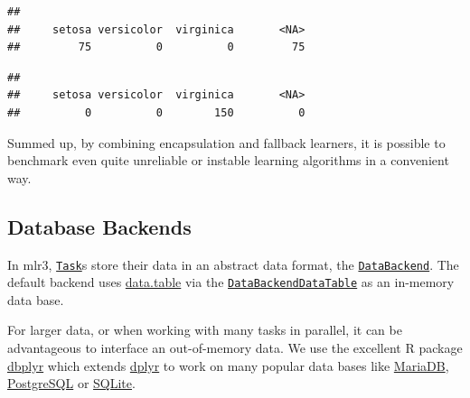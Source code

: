 \documentclass[]{article}
\newenvironment{Shaded}{\begin{snugshade}}{\end{snugshade}}
\newcommand{\CommentTok}[1]{\textcolor[rgb]{0.56,0.35,0.01}{\textit{#1}}}
\newcommand{\DataTypeTok}[1]{\textcolor[rgb]{0.13,0.29,0.53}{#1}}
\newcommand{\KeywordTok}[1]{\textcolor[rgb]{0.13,0.29,0.53}{\textbf{#1}}}
\newcommand{\NormalTok}[1]{#1}
\newcommand{\OperatorTok}[1]{\textcolor[rgb]{0.81,0.36,0.00}{\textbf{#1}}}
\newcommand{\StringTok}[1]{\textcolor[rgb]{0.31,0.60,0.02}{#1}}
\renewenvironment{Shaded} {\begin{snugshade}\small} {\end{snugshade}}
\begin{document}
\begin{verbatim}
## 
##     setosa versicolor  virginica       <NA> 
##         75          0          0         75
\end{verbatim}

\begin{Shaded}
\end{Shaded}

\begin{verbatim}
## 
##     setosa versicolor  virginica       <NA> 
##          0          0        150          0
\end{verbatim}

Summed up, by combining encapsulation and fallback learners, it is possible to benchmark even quite unreliable or instable learning algorithms in a convenient way.

\hypertarget{backends}{%
\subsection{Database Backends}\label{backends}}

In mlr3, \href{https://mlr3.mlr-org.com/reference/Task.html}{\texttt{Task}}s store their data in an abstract data format, the \href{https://mlr3.mlr-org.com/reference/DataBackend.html}{\texttt{DataBackend}}.
The default backend uses \href{https://cran.r-project.org/package=data.table}{data.table} via the \href{https://mlr3.mlr-org.com/reference/DataBackendDataTable.html}{\texttt{DataBackendDataTable}} as an in-memory data base.

For larger data, or when working with many tasks in parallel, it can be advantageous to interface an out-of-memory data.
We use the excellent R package \href{https://cran.r-project.org/package=dbplyr}{dbplyr} which extends \href{https://cran.r-project.org/package=dplyr}{dplyr} to work on many popular data bases like \href{https://mariadb.org/}{MariaDB}, \href{https://www.postgresql.org/}{PostgreSQL} or \href{https://www.sqlite.org}{SQLite}.
\end{document}
